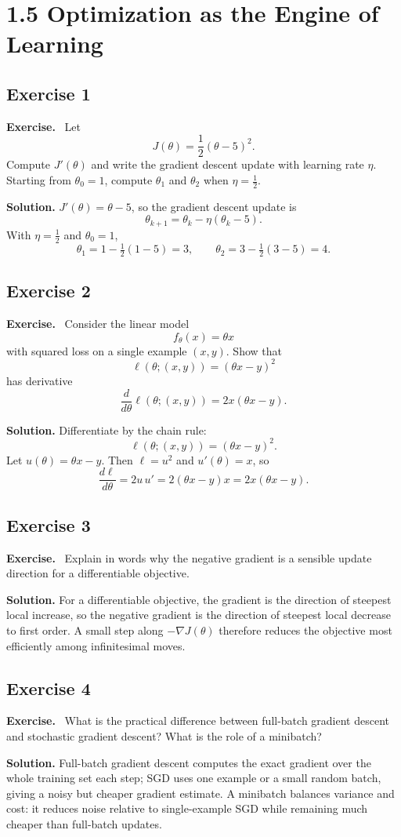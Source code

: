 \documentclass[11pt]{article}
\newenvironment{exercisebox}{\begin{framed}\noindent\textbf{Exercise.}\ }{\end{framed}}
\begin{document}
\section{1.5 Optimization as the Engine of Learning}
\subsection*{Exercise 1}
\begin{exercisebox}
Let
\[
J(\theta)=\frac12(\theta-5)^2.
\]
Compute $J'(\theta)$ and write the gradient descent update with learning rate $\eta$. Starting from $\theta_0=1$, compute $\theta_1$ and $\theta_2$ when $\eta=\frac12$.
\end{exercisebox}
\textbf{Solution.} $J'(\theta)=\theta-5$, so the gradient descent update is
\[
\theta_{k+1}=\theta_k-\eta(\theta_k-5).
\]
With $\eta=\tfrac12$ and $\theta_0=1$,
\[
\theta_1=1-\tfrac12(1-5)=3,
\qquad
\theta_2=3-\tfrac12(3-5)=4.
\]

\subsection*{Exercise 2}
\begin{exercisebox}
Consider the linear model
\[
f_\theta(x)=\theta x
\]
with squared loss on a single example $(x,y)$. Show that
\[
\ell(\theta;(x,y))=(\theta x-y)^2
\]
has derivative
\[
\frac{d}{d\theta}\ell(\theta;(x,y))=2x(\theta x-y).
\]
\end{exercisebox}
\textbf{Solution.} Differentiate by the chain rule:
\[
\ell(\theta;(x,y))=(\theta x-y)^2.
\]
Let $u(\theta)=\theta x-y$. Then $\ell=u^2$ and $u'(\theta)=x$, so
\[
\frac{d\ell}{d\theta}=2u\,u'=2(\theta x-y)x=2x(\theta x-y).
\]

\subsection*{Exercise 3}
\begin{exercisebox}
Explain in words why the negative gradient is a sensible update direction for a differentiable objective.
\end{exercisebox}
\textbf{Solution.} For a differentiable objective, the gradient is the direction of steepest local increase, so the negative gradient is the direction of steepest local decrease to first order. A small step along $-\nabla J(\theta)$ therefore reduces the objective most efficiently among infinitesimal moves.

\subsection*{Exercise 4}
\begin{exercisebox}
What is the practical difference between full-batch gradient descent and stochastic gradient descent? What is the role of a minibatch?
\end{exercisebox}
\textbf{Solution.} Full-batch gradient descent computes the exact gradient over the whole training set each step; SGD uses one example or a small random batch, giving a noisy but cheaper gradient estimate. A minibatch balances variance and cost: it reduces noise relative to single-example SGD while remaining much cheaper than full-batch updates.
\end{document}

